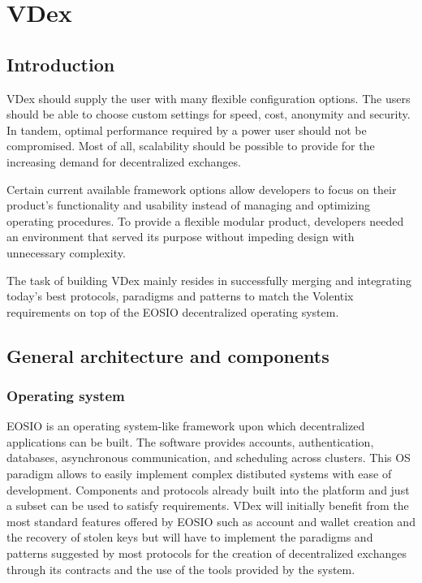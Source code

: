 \documentclass[]{article}
\begin{document}
	
\section{VDex}	

\subsection{Introduction}
	 VDex should supply the user with many flexible configuration options. The users should be able to choose custom 
	settings for speed, cost, anonymity and security. In tandem, optimal  performance required by a power user should not be compromised. Most of all, scalability should be possible to provide for the increasing demand for decentralized exchanges. 
	
	Certain current available framework options allow developers to focus on their product's functionality and usability instead of managing and optimizing operating procedures. To provide a flexible modular product, developers needed an environment that served its purpose without impeding design with unnecessary complexity. 
	
	The task of building VDex mainly resides in successfully merging
	and integrating today's best protocols, paradigms and patterns to match the 
	Volentix requirements on top of the EOSIO decentralized operating system.
	

\subsection{General architecture and components}
	
	\subsubsection{Operating system}
	EOSIO is an operating system-like framework upon which decentralized applications can be built. The software provides accounts, authentication, databases, asynchronous communication, and scheduling across clusters. 
	This OS paradigm allows to easily implement complex distibuted systems with ease of development.
	Components and protocols already built into the platform and just a subset can be used to satisfy requirements.
	VDex will initially benefit from the most standard features offered by EOSIO such as account and wallet creation and the recovery of stolen keys but will have to implement the paradigms and patterns suggested by most protocols for the creation of decentralized exchanges through its contracts and the use of the tools provided by the system.\\
\end{document}
